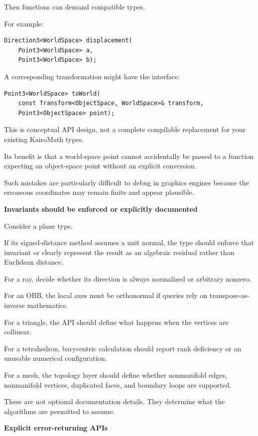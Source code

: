Then functions can demand compatible types.

For example:

\begin{verbatim}
Direction3<WorldSpace> displacement(
    Point3<WorldSpace> a,
    Point3<WorldSpace> b);
\end{verbatim}

A corresponding transformation might have the interface:

\begin{verbatim}
Point3<WorldSpace> toWorld(
    const Transform<ObjectSpace, WorldSpace>& transform,
    Point3<ObjectSpace> point);
\end{verbatim}

This is conceptual API design, not a complete compilable replacement for your existing KairoMath types.

Its benefit is that a world-space point cannot accidentally be passed to a function expecting an object-space point without an explicit conversion.

Such mistakes are particularly difficult to debug in graphics engines because the erroneous coordinates may remain finite and appear plausible.

\textbf{Invariants should be enforced or explicitly documented}

Consider a plane type.

If its signed-distance method assumes a unit normal, the type should enforce that invariant or clearly represent the result as an algebraic residual rather than Euclidean distance.

For a ray, decide whether its direction is always normalized or arbitrary nonzero.

For an OBB, the local axes must be orthonormal if queries rely on transpose-as-inverse mathematics.

For a triangle, the API should define what happens when the vertices are collinear.

For a tetrahedron, barycentric calculation should report rank deficiency or an unusable numerical configuration.

For a mesh, the topology layer should define whether nonmanifold edges, nonmanifold vertices, duplicated faces, and boundary loops are supported.

These are not optional documentation details. They determine what the algorithms are permitted to assume.

\textbf{Explicit error-returning APIs}

